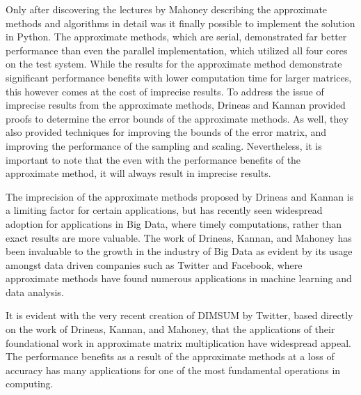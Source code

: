 \documentclass[oneside]{article}
\begin{document}
Only after discovering the lectures by Mahoney describing the approximate methods and algorithms in detail was it finally possible to implement the solution in Python. The approximate methods, which are serial, demonstrated far better performance than even the parallel implementation, which utilized all four cores on the test system. While the results for the approximate method demonstrate significant performance benefits with lower computation time for larger matrices, this however comes at the cost of imprecise results. To address the issue of imprecise results from the approximate methods, Drineas and Kannan provided proofs to determine the error bounds of the approximate methods\cite{drineas2001fast}. As well, they also provided techniques for improving the bounds of the error matrix, and improving the performance of the sampling and scaling. Nevertheless, it is important to note that the even with the performance benefits of the approximate method, it will always result in imprecise results.

The imprecision of the approximate methods proposed by Drineas and Kannan is a limiting factor for certain applications, but has recently seen widespread adoption for applications in Big Data, where timely computations, rather than exact results are more valuable\cite{mahoney2011randomized, zadeh2013dimension}. The work of Drineas, Kannan, and Mahoney has been invaluable to the growth in the industry of Big Data as evident by its usage amongst data driven companies such as Twitter and Facebook, where approximate methods have found numerous applications in machine learning and data analysis.

It is evident with the very recent creation of DIMSUM by Twitter, based directly on the work of Drineas, Kannan, and Mahoney, that the applications of their foundational work in approximate matrix multiplication have widespread appeal. The performance benefits as a result of the approximate methods at a loss of accuracy has many applications for one of the most fundamental operations in computing.



\newpage

\singlespacing

\end{document}
